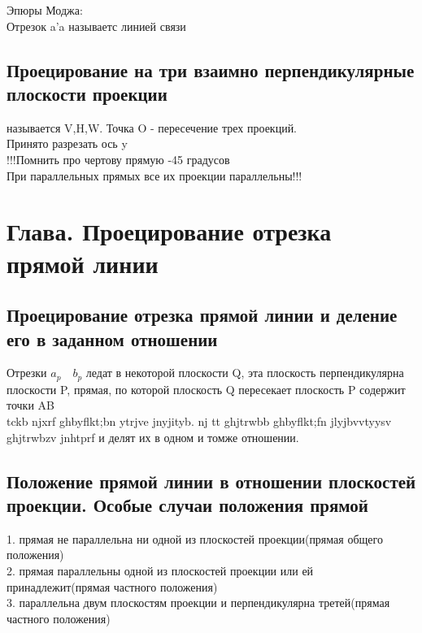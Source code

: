 \documentclass[a4paper, 12pt]{article}
\begin{document}
Эпюры Моджа:\\
Отрезок a'a называетс линией связи\\

\subsection{Проецирование на три взаимно перпендикулярные плоскости проекции}


называется V,H,W. Точка O - пересечение трех проекций.\\

Принято разрезать ось y\\

!!!Помнить про чертову прямую -45 градусов\\
При параллельных прямых все их проекции параллельны!!!\\

\section{Глава. Проецирование отрезка прямой линии}
\subsection{Проецирование отрезка прямой линии и деление его в заданном отношении}

Отрезки $a_p \quad b_p$ ледат в некоторой плоскости Q, эта плоскость перпендикулярна плоскости P, прямая, по которой плоскость Q пересекает плоскость P содержит точки AB\\

tckb njxrf ghbyflkt;bn ytrjve jnyjityb. nj tt ghjtrwbb ghbyflkt;fn jlyjbvvtyysv ghjtrwbzv jnhtprf и делят их в одном и томже отношении.%
\\

\subsection{Положение прямой линии в отношении плоскостей проекции. Особые случаи положения прямой}
1. прямая не параллельна ни одной из плоскостей проекции(прямая общего положения)\\
2. прямая параллельны одной из плоскостей проекции или ей принадлежит(прямая частного положения)\\
3. параллельна двум плоскостям проекции и перпендикулярна третей(прямая частного положения)\\
\end{document}
